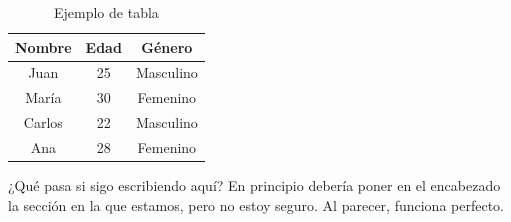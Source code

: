 \documentclass[12pt, a4paper]{article}
\begin{document}
\begin{table}[htbp]
    \centering
    \begin{tabular}{|c|c|c|}
        \hline
        \textbf{Nombre} & \textbf{Edad} & \textbf{Género} \\
        \hline
        Juan & 25 & Masculino \\
        María & 30 & Femenino \\
        Carlos & 22 & Masculino \\
        Ana & 28 & Femenino \\
        \hline
    \end{tabular}
    \caption{Ejemplo de tabla}
    \label{tab:ejemplo}
\end{table}
\newpage
¿Qué pasa si sigo escribiendo aquí? En principio debería poner en el encabezado la sección en la que estamos, pero no estoy seguro. Al parecer, funciona perfecto.

\newpage\printbibliography
{}
\end{document}
